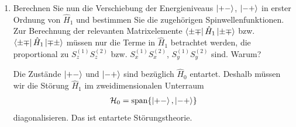\documentclass[11pt,a4paper]{scrartcl}
\newcommand{\op}[1]{\hat{#1}}
\begin{document}
\begin{enumerate}[label=(\alph*)]
\begin{calculationbox}
            \begin{calculationbox}[title=Energieverschiebung für $\ket{++}$ und $\ket{--}$]
                Für beide Zustände gilt
                \begin{align*}
                    \bra{++}S_z^{(1)}S_z^{(2)}\ket{++}
                    &=
                    \frac{\hbar}{2}\frac{\hbar}{2}
                    =
                    \frac{\hbar^2}{4},\\
                    \bra{--}S_z^{(1)}S_z^{(2)}\ket{--}
                    &=
                    \left(-\frac{\hbar}{2}\right)
                    \left(-\frac{\hbar}{2}\right)
                    =
                    \frac{\hbar^2}{4}.
                \end{align*}
                Daher ist die Verschiebung erster Ordnung
                \begin{align*}
                    \Delta E_{++}^{(1)}
                    =
                    \Delta E_{--}^{(1)}
                    &=
                    \frac{\Omega}{\hbar}
                    (1-3\cos^2\theta)
                    \frac{\hbar^2}{4}\\
                    &=
                    \boxed{
                    \frac{\hbar\Omega}{4}(1-3\cos^2\theta)}.
                \end{align*}
            \end{calculationbox}
        \end{calculationbox}

        \item Berechnen Sie nun die Verschiebung der Energieniveaus $\ket{+-}$, $\ket{-+}$ in erster Ordnung von $\op H_1$ und bestimmen Sie die zugehörigen Spinwellenfunktionen. Zur Berechnung der relevanten Matrixelemente $\bra{\pm\mp}\op H_1\ket{\pm\mp}$ bzw. $\bra{\pm\mp}\op H_1\ket{\mp\pm}$ müssen nur die Terme in $\op H_1$ betrachtet werden, die proportional zu $S_z^{(1)}S_z^{(2)}$ bzw. $S_x^{(1)}S_x^{(2)}$, $S_y^{(1)}S_y^{(2)}$ sind. Warum?

        \begin{calculationbox}
            \begin{solutionbox}
                Die Zustände $\ket{+-}$ und $\ket{-+}$ sind bezüglich $\op H_0$ entartet. Deshalb müssen wir die Störung $\op H_1$ im zweidimensionalen Unterraum
                \begin{align*}
                    \mathcal H_{0}
                    =
                    \operatorname{span}\{\ket{+-},\ket{-+}\}
                \end{align*}
                diagonalisieren. Das ist entartete Störungstheorie.
            \end{solutionbox}


\end{calculationbox}
\end{enumerate}
\end{document}
